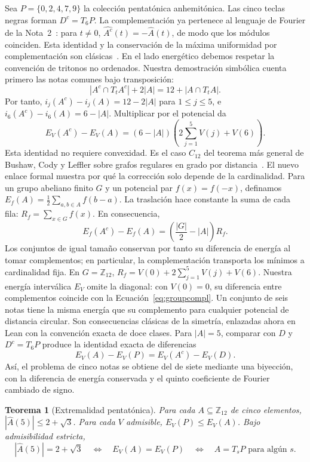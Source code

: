\documentclass[11pt]{article}
\newtheorem{theorem}{Teorema}
\newcommand{\Ztwelve}{\mathbb{Z}_{12}}
\newcommand{\Ahat}{\widehat A}
\begin{document}
Sea $P=\{0,2,4,7,9\}$ la colección pentatónica anhemitónica. Las cinco teclas negras
forman $D^c=T_6P$. La complementación ya pertenece al lenguaje de Fourier de la
Nota~2~\cite{Phase}: para $t\ne0$, $\widehat{A^c}(t)=-\Ahat(t)$, de modo que los módulos
coinciden. Esta identidad y la conservación de la máxima uniformidad por complementación
son clásicas~\cite{Amiot2006}. En el lado energético debemos respetar la convención de
tritonos no ordenados. Nuestra demostración simbólica cuenta primero las notas comunes
bajo transposición:
\[
 |A^c\cap T_tA^c|+2|A|=12+|A\cap T_tA|.
\]
Por tanto, $i_j(A^c)-i_j(A)=12-2|A|$ para $1\le j\le5$, e
$i_6(A^c)-i_6(A)=6-|A|$. Multiplicar por el potencial da
\begin{equation}\label{eq:complenergy}
 E_V(A^c)-E_V(A)=(6-|A|)\left(2\sum_{j=1}^5V(j)+V(6)\right).
\end{equation}
Esta identidad no requiere convexidad. Es el caso $C_{12}$ del teorema más general de
Bushaw, Cody y Leffler sobre grafos regulares en grado por distancia~\cite[Teorema~3.5]{BCL}.
El nuevo enlace formal muestra por qué la corrección solo depende de la cardinalidad.
Para un grupo abeliano finito $G$ y un potencial par $f(x)=f(-x)$, definamos
$E_f(A)=\frac12\sum_{a,b\in A}f(b-a)$. La traslación hace constante la suma de cada fila:
$R_f=\sum_{x\in G}f(x)$. En consecuencia,
\begin{equation}\label{eq:groupcompl}
 E_f(A^c)-E_f(A)=\left(\frac{|G|}{2}-|A|\right)R_f.
\end{equation}
Los conjuntos de igual tamaño conservan por tanto su diferencia de energía al tomar
complementos; en particular, la complementación transporta los mínimos a cardinalidad
fija. En $G=\Ztwelve$, $R_f=V(0)+2\sum_{j=1}^5V(j)+V(6)$.
Nuestra energía interválica $E_V$ omite la diagonal: con $V(0)=0$, su diferencia entre
complementos coincide con la Ecuación~\eqref{eq:groupcompl}. Un conjunto de seis notas
tiene la misma energía que su complemento para cualquier potencial de distancia circular.
Son consecuencias clásicas de la simetría, enlazadas ahora en Lean con la convención
exacta de doce clases.
Para $|A|=5$, comparar con $D$ y $D^c=T_6P$ produce la identidad exacta de diferencias
\[
 E_V(A)-E_V(P)=E_V(A^c)-E_V(D).
\]
Así, el problema de cinco notas se obtiene del de siete mediante una biyección, con la
diferencia de energía conservada y el quinto coeficiente de Fourier cambiado de signo.

\begin{theorem}[Extremalidad pentatónica]\label{thm:pentatonic}
Para cada $A\subseteq\Ztwelve$ de cinco elementos, $|\Ahat(5)|\le2+\sqrt3$.
Para cada $V$ admisible, $E_V(P)\le E_V(A)$. Bajo admisibilidad estricta,
\[
 |\Ahat(5)|=2+\sqrt3\quad\Longleftrightarrow\quad
 E_V(A)=E_V(P)\quad\Longleftrightarrow\quad A=T_sP\text{ para algún }s.
\]
\end{theorem}
\end{document}
